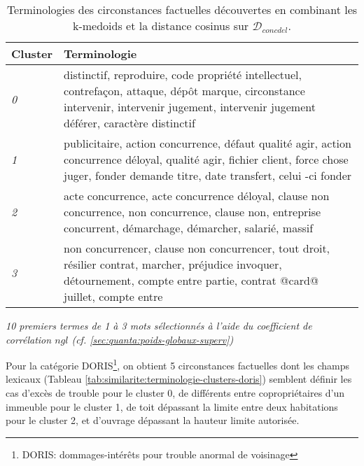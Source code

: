 
\begin{table}[ht]
	\centering \scriptsize
	\begin{tabular}{|l|p{}|}
		\hline
		\textbf{Cluster} & \textbf{Terminologie} \\ \hline
		\textit{0} & distinctif, reproduire, code propriété intellectuel, contrefaçon, attaque, dépôt marque, circonstance intervenir, intervenir jugement, intervenir jugement déférer, caractère distinctif
		\\ \hline
		\textit{1} & publicitaire, action concurrence, défaut qualité agir, action concurrence déloyal, qualité agir, fichier client, force chose juger, fonder demande titre, date transfert, celui -ci fonder
		\\ \hline
		\textit{2} & acte concurrence, acte concurrence déloyal, clause non concurrence, non concurrence, clause non, entreprise concurrent, démarchage, démarcher, salarié, massif
		\\ \hline
		\textit{3} & non concurrencer, clause non concurrencer, tout droit, résilier contrat, marcher, préjudice invoquer, détournement, compte entre partie, contrat @card@ juillet, compte entre
		\\ \hline
	\end{tabular}
	
	\textit{10 premiers termes de 1 à 3 mots sélectionnés à l'aide du coefficient de corrélation $ngl$ (cf. \ref{sec:quanta:poids-globaux-superv})}
	\caption{Terminologies des circonstances factuelles découvertes en combinant les k-medoids et la distance cosinus sur $\mathcal{D}_{concdel}$.}\label{tab:similarite:terminologie-clusters-concdel}
\end{table}

Pour la catégorie DORIS\footnote{DORIS: dommages-intérêts pour trouble anormal de voisinage},  on obtient 5 circonstances factuelles dont les champs lexicaux (Tableau \ref{tab:similarite:terminologie-clusters-doris}) semblent définir les cas d'excès de trouble pour le cluster 0, de différents entre copropriétaires d'un immeuble pour le cluster 1, de toit dépassant la limite entre deux habitations pour le cluster 2, et d'ouvrage dépassant la hauteur limite autorisée. 

